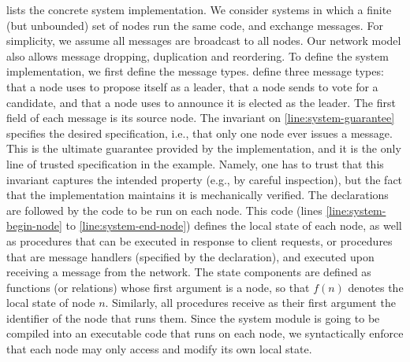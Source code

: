  lists the concrete system implementation.  We
consider systems in which a finite (but unbounded) set of nodes run
the same code, and exchange messages. For simplicity, we assume all
messages are broadcast to all nodes. Our network model also allows
message dropping, duplication and reordering. To define the system
implementation, we first define the message
types. 
define three message types: {\msgrequestvote} that a node uses to
propose itself as a leader, {\msgvote} that a node sends to vote for a
candidate, and {\msgleader} that a node uses to announce it is elected
as the leader. The first field of each message is its source
node.
The invariant on \cref{line:system-guarantee} specifies the desired specification, i.e., that only
one node ever issues a {\msgleader}
message. This is the ultimate guarantee provided by the implementation,
and it is the only line of trusted specification in the
example. Namely, one has to trust that this invariant captures the intended property (e.g., by careful inspection),
but the fact that the implementation maintains it is mechanically verified.
The declarations are followed by the code to be run on each node. This
code (lines \ref{line:system-begin-node} to
\ref{line:system-end-node}) defines the local state of each node, as
well as procedures that can be executed in response to client
requests, or procedures that are message handlers (specified by the
 declaration), and executed upon receiving a message
from the network. The state components are defined as functions (or
relations) whose first argument is a node, so that $f(n)$ denotes the
local state of node $n$.  Similarly, all procedures receive as their
first argument the {\self} identifier of the node that runs them.
Since the system module is going to be compiled into an executable
code that runs on each node, we syntactically enforce that each node
may only access and modify its own local state.


